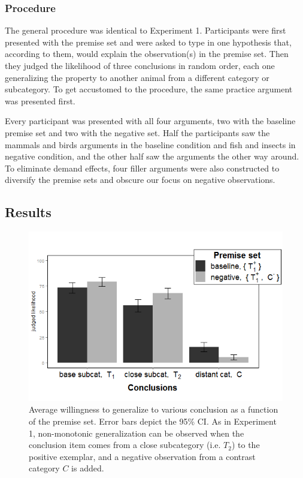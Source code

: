 \documentclass[authoryear,11pt]{elsarticle}
\begin{document}
\subsubsection{Procedure}

The general procedure was identical to Experiment 1. Participants were first presented with the premise set and were asked to type in one hypothesis that, according to them, would explain the observation(s) in the premise set. Then they judged the likelihood of three conclusions in random order, each one generalizing the property to another animal from a different category or subcategory. To get accustomed to the procedure, the same practice argument was presented first.

Every participant was presented with all four arguments, two with the {\sc baseline} premise set and two with the {\sc negative} set. Half the participants saw the mammals and birds arguments in the {\sc baseline} condition and fish and insects in {\sc negative} condition, and the other half saw the arguments the other way around. To eliminate demand effects, four filler arguments were also constructed to diversify the premise sets and obscure our focus on negative observations.

\subsection{Results}

\begin{figure}[t]
\begin{center}
\includegraphics[scale=.45]{fig/Exp2_gen_all.png}
\end{center}
\vspace{-7mm}
\caption{\small Average willingness to generalize to various conclusion as a function of the premise set. Error bars depict the 95\% CI. As in Experiment 1, non-monotonic generalization can be observed when the conclusion item comes from a close subcategory (i.e. $T_2$) to the positive exemplar, and a negative observation from a contrast category $C$ is added. \normalsize}
\label{fig:Exp2_MainEffects}
\end{figure}
\end{document}
